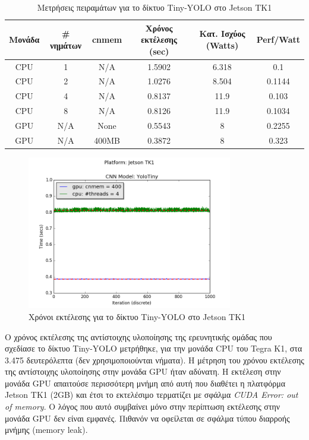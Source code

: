 \begin{table}[H]
  \begin{center}
    \caption{Μετρήσεις πειραμάτων για το δίκτυο Tiny-YOLO στο Jetson TK1}
    \label{tab:yolo_jetson}
    \small
    \begin{tabular}[center]{ | c | c | c | c | c | c | }
      \hline
      \rowcolor{Gray}
      Μονάδα & \# νημάτων & cnmem & Χρόνος εκτέλεσης (sec) & Κατ. Ισχύος (Watts) & Perf/Watt \\
      \hline
      CPU & 1 & N/A & 1.5902 & 6.318 & 0.1\\
      CPU & 2 & N/A & 1.0276 & 8.504 & 0.1144\\
      CPU & 4 & N/A & 0.8137 & 11.9 & 0.103\\
      CPU & 8 & N/A & 0.8126 & 11.9 & 0.1034\\
      GPU & N/A & None & 0.5543 & 8 & 0.2255\\
      GPU & N/A & 400MB & 0.3872 & 8 & 0.323\\
      \hline
    \end{tabular}
  \end{center}
\end{table}

\begin{figure}[H]
  \centering
  \includegraphics[width=0.8\textwidth]{./images/chapter6/benchmark_yolotiny_jetson.png}
  \caption[Χρόνoι εκτέλεσης για το δίκτυο Tiny-YOLO στο Jetson TK1]{Χρόνοι εκτέλεσης για το δίκτυο Tiny-YOLO στο Jetson TK1}
  \label{fig:yolotiny_results_jetson}
\end{figure}

Ο χρόνος εκτέλεσης της αντίστοιχης υλοποίησης της ερευνητικής ομάδας που
σχεδίασε το δίκτυο Tiny-YOLO μετρήθηκε, για την μονάδα CPU του Tegra K1,
στα 3.475 δευτερόλεπτα (δεν χρησιμοποιούνται νήματα).
Η μέτρηση του χρόνου εκτέλεσης της αντίστοιχης
υλοποίησης στην μονάδα GPU ήταν αδύνατη. Η εκτέλεση στην μονάδα GPU
απαιτούσε περισσότερη μνήμη από αυτή που διαθέτει η πλατφόρμα Jetson TK1 (2GB) και έτσι
το εκτελέσιμο τερματίζει με σφάλμα \emph{CUDA Error: out of memory}.
Ο λόγος που αυτό συμβαίνει μόνο στην περίπτωση εκτέλεσης στην μονάδα GPU
δεν είναι εμφανές. Πιθανόν να οφείλεται σε σφάλμα τύπου διαρροής μνήμης (memory leak).

